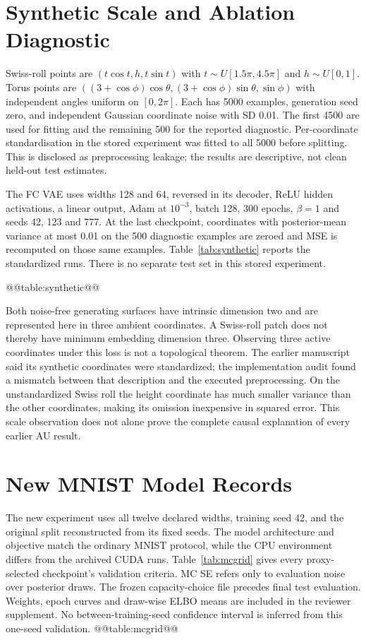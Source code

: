 \section{Synthetic Scale and Ablation Diagnostic}\label{app:synthetic}
Swiss-roll points are $(t\cos t,h,t\sin t)$ with
$t\sim U[1.5\pi,4.5\pi]$ and $h\sim U[0,1]$. Torus points are
$((3+\cos\phi)\cos\theta,(3+\cos\phi)\sin\theta,\sin\phi)$ with
independent angles uniform on $[0,2\pi]$. Each has 5000 examples,
generation seed zero, and independent Gaussian coordinate noise with
SD 0.01. The first 4500 are used for fitting and the remaining 500 for
the reported diagnostic. Per-coordinate standardisation in the stored
experiment was fitted to all 5000 before splitting. This is disclosed
as preprocessing leakage; the results are descriptive, not clean
held-out test estimates.

The FC VAE uses widths 128 and 64, reversed in its decoder, ReLU hidden
activations, a linear output, Adam at $10^{-3}$, batch 128, 300 epochs,
$\beta=1$ and seeds 42, 123 and 777. At the last checkpoint, coordinates
with posterior-mean variance at most 0.01 on the 500 diagnostic examples
are zeroed and MSE is recomputed on those same examples.
Table~\ref{tab:synthetic} reports the standardized runs. There is no
separate test set in this stored experiment.

@@table:synthetic@@

Both noise-free generating surfaces have intrinsic dimension two and
are represented here in three ambient coordinates. A Swiss-roll patch
does not thereby have minimum embedding dimension three. Observing
three active coordinates under this loss is not a topological theorem.
The earlier manuscript said its synthetic coordinates were standardized;
the implementation audit found a mismatch between that description and
the executed preprocessing. On the unstandardized Swiss roll the height
coordinate has much smaller variance than the other coordinates, making
its omission inexpensive in squared error. This scale observation does
not alone prove the complete causal explanation of every earlier AU
result.

\section{New MNIST Model Records}\label{app:newmodels}
The new experiment uses all twelve declared widths, training seed 42,
and the original split reconstructed from its fixed seeds. The model
architecture and objective match the ordinary MNIST protocol, while
the CPU environment differs from the archived CUDA runs.
Table~\ref{tab:mcgrid} gives every proxy-selected checkpoint's validation
criteria. MC SE refers only to evaluation noise over posterior draws.
The frozen capacity-choice file precedes final test evaluation.
Weights, epoch curves and draw-wise ELBO means are included in the
reviewer supplement. No between-training-seed confidence interval is
inferred from this one-seed validation.
@@table:mcgrid@@

